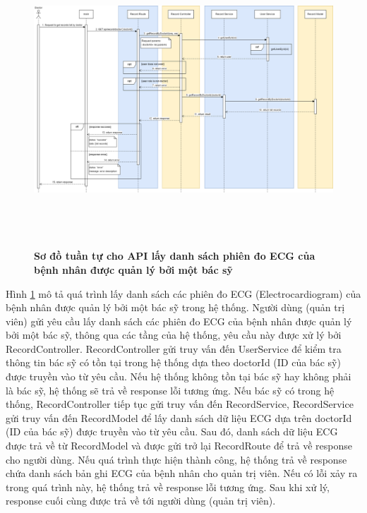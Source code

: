  \begin{figure}[H]
  \centering
  \includegraphics[width=16cm,height=11cm]{Images/sequence_api/getRecordsByDoctor.png}
  \caption[Sơ đồ tuần tự cho API lấy danh sách phiên đo ECG của bệnh nhân được quản lý bởi một bác sỹ ]{\bfseries \fontsize{12pt}{0pt}
  \selectfont Sơ đồ tuần tự cho API lấy danh sách phiên đo ECG của bệnh nhân được quản lý bởi một bác sỹ}
  \label{api_getRecordsByDoctor} %
\end{figure}
Hình \ref{api_getRecordsByDoctor} mô tả quá trình lấy danh sách các phiên đo ECG (Electrocardiogram) của bệnh nhân được quản lý bởi một bác sỹ trong hệ thống. Người dùng (quản trị viên) gửi yêu cầu lấy danh sách các phiên đo ECG của bệnh nhân được quản lý bởi một bác sỹ, 
thông qua các tầng của hệ thống, yêu cầu này được xử lý bởi RecordController. RecordController gửi truy vấn đến UserService để kiểm tra thông tin bác sỹ có tồn tại trong hệ thống dựa theo doctorId (ID của bác sỹ) được truyền vào từ yêu cầu. Nếu hệ thống không tồn tại bác sỹ hay không phải là bác sỹ, hệ thống sẽ
trả về response lỗi tương ứng. Nếu bác sỹ có trong hệ thống, RecordController tiếp tục gửi truy vấn đến RecordService, RecordService gửi truy vấn đến RecordModel để lấy danh sách dữ liệu ECG dựa trên doctorId (ID của bác sỹ) được truyền vào từ yêu cầu. 
Sau đó, danh sách dữ liệu ECG được trả về từ RecordModel và được gửi trở lại RecordRoute để trả về response cho người dùng. Nếu quá trình thực hiện thành công, hệ thống trả về response chứa danh sách bản ghi ECG của bệnh nhân cho quản trị viên. Nếu có lỗi xảy ra
 trong quá trình này, hệ thống trả về response lỗi tương ứng. Sau khi xử lý, response cuối cùng được trả về tới người dùng (quản trị viên).

